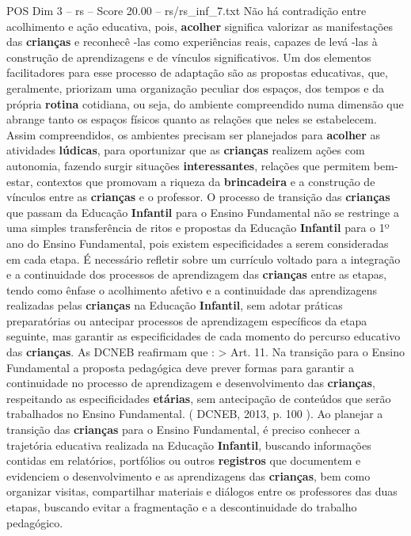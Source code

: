 \begin{textsample}{POS Dim 3 – rs – Score 20.00 – rs/rs\_inf\_7.txt}
Não há contradição entre acolhimento e ação educativa, pois, \textbf{acolher} significa valorizar as manifestações das \textbf{crianças} e reconhecê -las como experiências reais, capazes de levá -las à construção de aprendizagens e de vínculos significativos.
Um dos elementos facilitadores para esse processo de adaptação são as propostas educativas, que, geralmente, priorizam uma organização peculiar dos espaços, dos tempos e da própria \textbf{rotina} cotidiana, ou seja, do ambiente compreendido numa dimensão que abrange tanto os espaços físicos quanto as relações que neles se estabelecem.
Assim compreendidos, os ambientes precisam ser planejados para \textbf{acolher} as atividades \textbf{lúdicas}, para oportunizar que as \textbf{crianças} realizem ações com autonomia, fazendo surgir situações \textbf{interessantes}, relações que permitem bem-estar, contextos que promovam a riqueza da \textbf{brincadeira} e a construção de vínculos entre as \textbf{crianças} e o professor.
O processo de transição das \textbf{crianças} que passam da Educação \textbf{Infantil} para o Ensino Fundamental não se restringe a uma simples transferência de ritos e propostas da Educação \textbf{Infantil} para o 1º ano do Ensino Fundamental, pois existem especificidades a serem consideradas em cada etapa.
É necessário refletir sobre um currículo voltado para a integração e a continuidade dos processos de aprendizagem das \textbf{crianças} entre as etapas, tendo como ênfase o acolhimento afetivo e a continuidade das aprendizagens realizadas pelas \textbf{crianças} na Educação \textbf{Infantil}, sem adotar práticas preparatórias ou antecipar processos de aprendizagem específicos da etapa seguinte, mas garantir as especificidades de cada momento do percurso educativo das \textbf{crianças}.
As DCNEB reafirmam que : > Art. 11.
Na transição para o Ensino Fundamental a proposta pedagógica deve prever formas para garantir a continuidade no processo de aprendizagem e desenvolvimento das \textbf{crianças}, respeitando as especificidades \textbf{etárias}, sem antecipação de conteúdos que serão trabalhados no Ensino Fundamental. ( DCNEB, 2013, p. 100 ).
Ao planejar a transição das \textbf{crianças} para o Ensino Fundamental, é preciso conhecer a trajetória educativa realizada na Educação \textbf{Infantil}, buscando informações contidas em relatórios, portfólios ou outros \textbf{registros} que documentem e evidenciem o desenvolvimento e as aprendizagens das \textbf{crianças}, bem como organizar visitas, compartilhar materiais e diálogos entre os professores das duas etapas, buscando evitar a fragmentação e a descontinuidade do trabalho pedagógico.

\end{textsample}
